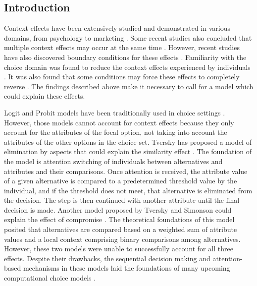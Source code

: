 \documentclass[a4paper,12pt]{article}
\newcommand{\citeyearonly}[1]{\citeyearpar{#1}}
\begin{document}
\newpage

\subsection{Introduction}

Context effects have been extensively studied and demonstrated in various domains, from psychology to marketing \citep{herne1997decoy, soltani2012range, truebloodEtAl13, frederickEtAl14, evangelidisEtAl18, wuConsguner20}. Some recent studies also concluded that multiple context effects may occur at the same time \citep{berkowitsch2014rigorously, noguchi2014attraction}. However, recent studies have also discovered boundary conditions for these effects \citep{liew2016appropriacy, spektor2018good, spektor2019similarity}. Familiarity with the choice domain was found to reduce the context effects experienced by individuals \citep{kim2005attraction, sheng2005understanding}.  It was also found that some conditions may force these effects to completely reverse \citep{cataldo2019comparison}. The findings described above make it necessary to call for a model which could explain these effects.

Logit and Probit models have been traditionally used in choice settings \citep{gensch1979multinomial, kim2017probit}. However, those models cannot account for context effects because they only account for the attributes of the focal option, not taking into account the attributes of the other options in the choice set. Tversky has proposed a model of elimination by aspects that could explain the similarity effect \citeyearonly{tversky1972elimination}. The foundation of the model is attention switching of individuals between alternatives and attributes and their comparisons. Once attention is received, the attribute value of a given alternative is compared to a predetermined threshold value by the individual, and if the threshold does not meet, that alternative is eliminated from the decision. The step is then continued with another attribute until the final decision is made. Another model proposed by Tversky and Simonson could explain the effect of compromise \citeyearonly{tverskySimonson93}. The theoretical foundations of this model posited that alternatives are compared based on a weighted sum of attribute values and a local context comprising binary comparisons among alternatives. However, these two models were unable to successfully account for all three effects. Despite their drawbacks, the sequential decision making and attention-based mechanisms in these models laid the foundations of many upcoming computational choice models \citep{bhatia2013associations}. 
\end{document}
